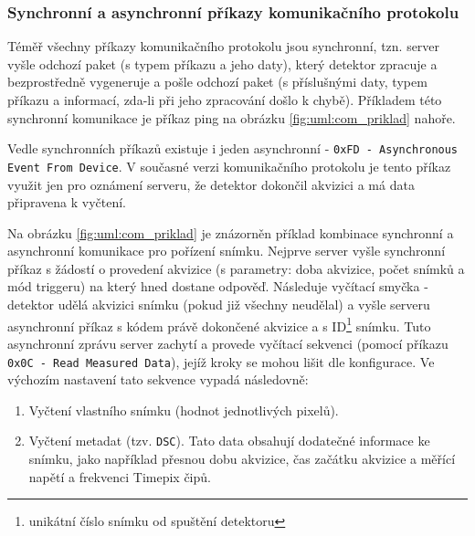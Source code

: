\subsubsection{Synchronní a asynchronní příkazy komunikačního protokolu}\label{atlas:com:synchonni_a_asynchonni_prikazy}
Téměř všechny příkazy komunikačního protokolu jsou synchronní, tzn. server vyšle odchozí paket (s typem příkazu a jeho daty), který detektor zpracuje a bezprostředně vygeneruje a pošle odchozí paket (s příslušnými daty, typem příkazu a informací, zda-li při jeho zpracování došlo k chybě). Příkladem této synchronní komunikace je příkaz ping na obrázku \ref{fig:uml:com_priklad} nahoře.

Vedle synchronních příkazů existuje i jeden asynchronní - \texttt{0xFD - Asynchronous Event From Device}. V současné verzi komunikačního protokolu je tento příkaz využit jen pro oznámení serveru, že detektor dokončil akvizici a má data připravena k vyčtení.

Na obrázku \ref{fig:uml:com_priklad} je znázorněn příklad kombinace synchronní a asynchronní komunikace pro pořízení snímku. Nejprve server vyšle synchronní příkaz s žádostí o provedení akvizice (s parametry: doba akvizice, počet snímků a mód triggeru) na který hned dostane odpověď. Následuje vyčítací smyčka - detektor udělá akvizici snímku (pokud již všechny neudělal) a vyšle serveru asynchronní příkaz s kódem právě dokončené akvizice a s ID\footnote{unikátní číslo snímku od spuštění detektoru} snímku. Tuto asynchronní zprávu server zachytí a provede vyčítací sekvenci (pomocí příkazu \texttt{0x0C - Read Measured Data}), jejíž kroky se mohou lišit dle konfigurace. Ve výchozím nastavení tato sekvence vypadá následovně:
\begin{enumerate}
	\item Vyčtení vlastního snímku (hodnot jednotlivých pixelů).
	\item Vyčtení metadat (tzv. \texttt{DSC}). Tato data obsahují dodatečné informace ke snímku, jako například přesnou dobu akvizice, čas začátku akvizice a měřící napětí a frekvenci Timepix čipů.
\end{enumerate}

